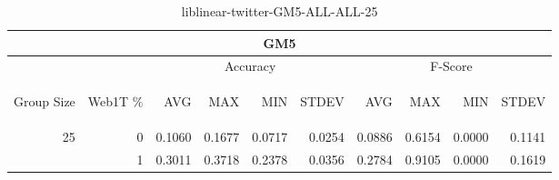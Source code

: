 \begin{center}
\begin{table}[htbp]
\begin{tabular}{ | r | r | r | r | r | r | r | r | r | r |}
\hline
\multicolumn{10}{|c|}{GM5}\\
\hline
 & & \multicolumn{4}{|c|}{Accuracy} & \multicolumn{4}{|c|}{F-Score}\\ \cline{3-10}
\begin{sideways}Group Size\end{sideways} & \begin{sideways}Web1T \%\end{sideways} & \begin{sideways}AVG\end{sideways} & \begin{sideways}MAX\end{sideways} & \begin{sideways}MIN\end{sideways} & \begin{sideways}STDEV\end{sideways} & \begin{sideways}AVG\end{sideways} & \begin{sideways}MAX\end{sideways} & \begin{sideways}MIN\end{sideways} & \begin{sideways}STDEV\end{sideways}\\
\hline
\multirow{1}{*}{25}
 & 0 & 0.1060 & 0.1677 & 0.0717 & 0.0254 & 0.0886 & 0.6154 & 0.0000 & 0.1141\\ \cline{2-10}
 & 1 & 0.3011 & 0.3718 & 0.2378 & 0.0356 & 0.2784 & 0.9105 & 0.0000 & 0.1619\\ \cline{2-10}
\hline
\end{tabular}
\caption{liblinear-twitter-GM5-ALL-ALL-25}
\label{table:liblinear-twitter-GM5-ALL-ALL-25}
\end{table}
\end{center}

